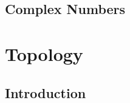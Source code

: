 \documentclass{book}
\begin{document}
	
	
	
	
	
	
	
	
	
	
	
	
	
	
	
	
	
	
	\section{Complex Numbers}
	
	
	
	
	
	
	
	
	
	
	
	
	
	
	
	
	
	
	
	
	
	
	
	
	
	
	
	
	
	
	
	
	
	
	
	
	
	
	
	
	
	
	
	
	
	
	
	
	
	
	
	
	
	
	
	
	
	
	
	
	
	
	
	
	
	
	
	
	
	
	
	
	
	
	\newpage
	\chapter{Topology}
	
	\section{Introduction}
	
\end{document}
